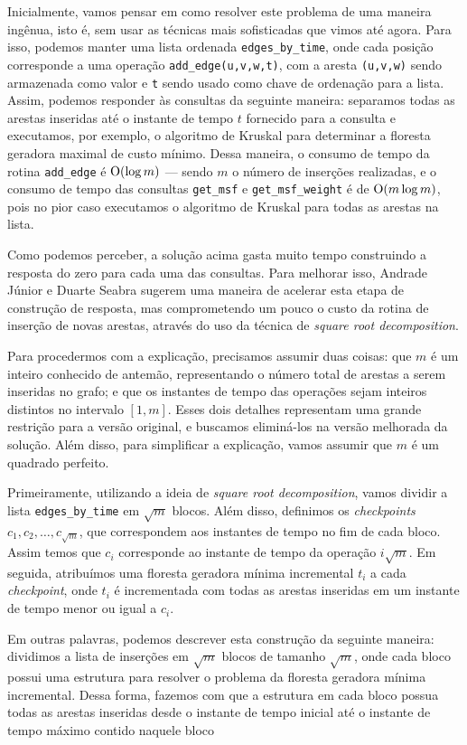 Inicialmente, vamos pensar em como resolver este problema de uma maneira ingênua, isto é, sem usar as técnicas mais sofisticadas que vimos até agora. Para isso, podemos manter uma lista ordenada \texttt{edges\_by\_time}, onde cada posição corresponde a uma operação \texttt{add\_edge(u,v,w,t)}, com a aresta \texttt{(u,v,w)} sendo armazenada como valor e \texttt{t} sendo usado como chave de ordenação para a lista. Assim, podemos responder às consultas da seguinte maneira: separamos todas as arestas inseridas até o instante de tempo $t$ fornecido para a consulta e executamos, por exemplo, o algoritmo de Kruskal para determinar a floresta geradora maximal de custo mínimo. Dessa maneira, o consumo de tempo da rotina \texttt{add\_edge} é $\mathrm{O} (\log m)$ --- sendo $m$ o número de inserções realizadas, e o consumo de tempo das consultas \texttt{get\_msf} e \texttt{get\_msf\_weight} é de $\mathrm{O}(m \log m)$, pois no pior caso executamos o algoritmo de Kruskal para todas as arestas na lista.

Como podemos perceber, a solução acima gasta muito tempo construindo a resposta do zero para cada uma das consultas. Para melhorar isso, Andrade Júnior e Duarte Seabra sugerem uma maneira de acelerar esta etapa de construção de resposta, mas comprometendo um pouco o custo da rotina de inserção de novas arestas, através do uso da técnica de \emph{square root decomposition}.

Para procedermos com a explicação, precisamos assumir duas coisas: que $m$ é um inteiro conhecido de antemão, representando o número total de arestas a serem inseridas no grafo; e que os instantes de tempo das operações sejam inteiros distintos no intervalo $[1,m]$. Esses dois detalhes representam uma grande restrição para a versão original, e buscamos eliminá-los na versão melhorada da solução. Além disso, para simplificar a explicação, vamos assumir que $m$ é um quadrado perfeito.

Primeiramente, utilizando a ideia de \emph{square root decomposition}, vamos dividir a lista \texttt{edges\_by\_time} em $\sqrt{m}$ blocos. Além disso, definimos os \emph{checkpoints} $c_1, c_2, \dots, c_{\sqrt{m}}$, que correspondem aos instantes de tempo no fim de cada bloco. Assim temos que $c_i$ corresponde ao instante de tempo da operação $i \sqrt{m}$. Em seguida, atribuímos uma floresta geradora mínima incremental $t_i$ a cada \emph{checkpoint}, onde $t_i$ é incrementada com todas as arestas inseridas em um instante de tempo menor ou igual a $c_i$.

Em outras palavras, podemos descrever esta construção da seguinte maneira: dividimos a lista de inserções em $\sqrt{m}$ blocos de tamanho $\sqrt{m}$, onde cada bloco possui uma estrutura para resolver o problema da floresta geradora mínima incremental. Dessa forma, fazemos com que a estrutura em cada bloco possua todas as arestas inseridas desde o instante de tempo inicial até o instante de tempo máximo contido naquele bloco

